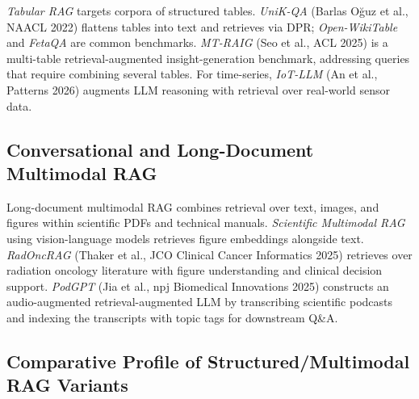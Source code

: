 \documentclass{article}
\begin{document}
\emph{Tabular RAG} targets corpora of structured tables. \emph{UniK-QA} (Barlas Oğuz et al., NAACL 2022) flattens tables into text and retrieves via DPR; \emph{Open-WikiTable} and \emph{FetaQA} are common benchmarks. \emph{MT-RAIG} (Seo et al., ACL 2025) is a multi-table retrieval-augmented insight-generation benchmark, addressing queries that require combining several tables. For time-series, \emph{IoT-LLM} (An et al., Patterns 2026) augments LLM reasoning with retrieval over real-world sensor data.

\subsection{Conversational and Long-Document Multimodal RAG}\label{conversational-and-long-document-multimodal-rag}

Long-document multimodal RAG combines retrieval over text, images, and figures within scientific PDFs and technical manuals. \emph{Scientific Multimodal RAG} using vision-language models retrieves figure embeddings alongside text. \emph{RadOncRAG} (Thaker et al., JCO Clinical Cancer Informatics 2025) retrieves over radiation oncology literature with figure understanding and clinical decision support. \emph{PodGPT} (Jia et al., npj Biomedical Innovations 2025) constructs an audio-augmented retrieval-augmented LLM by transcribing scientific podcasts and indexing the transcripts with topic tags for downstream Q\&A.

\subsection{Comparative Profile of Structured/Multimodal RAG Variants}\label{comparative-profile-of-structuredmultimodal-rag-variants}
\end{document}
